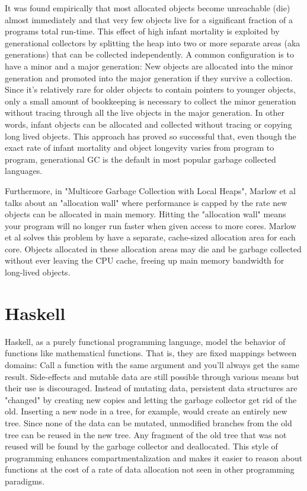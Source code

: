 \documentclass[a4paper,oneside]{memoir}
\begin{document}
It was found empirically that most allocated objects become unreachable (die)
almost immediately and that very few objects live for a significant fraction
of a programs total run-time.\cite{Courts:1988,Appel:1989} This effect of high infant mortality is exploited
by generational collectors by splitting the heap into two or more separate areas
(aka generations) that can be collected independently. A common configuration is
to have a minor and a major generation: New objects are allocated into the minor
generation and promoted into the major generation if they survive a collection.
Since it's relatively rare for older objects to contain pointers to younger
objects, only a small amount of bookkeeping is necessary to collect the minor
generation without tracing through all the live objects in the major generation.\cite{Appel:1989}
In other words, infant objects can be allocated and collected without tracing or
copying long lived objects. This approach has proved so successful that, even
though the exact rate of infant mortality and object longevity varies from
program to program, generational GC is the default in most popular garbage
collected languages.

Furthermore, in "Multicore Garbage Collection with Local Heaps", Marlow et al talks
about an "allocation wall" where performance is capped by the rate new objects
can be allocated in main memory.\cite{Marlow:2011} Hitting the "allocation wall" means your
program will no longer run faster when given access to more cores. Marlow et al
solves this problem by have a separate, cache-sized allocation area for each core.
Objects allocated in these allocation areas may die and be garbage collected
without ever leaving the CPU cache, freeing up main memory bandwidth for
long-lived objects.

\section{Haskell}

Haskell, as a purely functional programming language, model the behavior of
functions like mathematical functions. That is, they are fixed mappings between
domains: Call a function with the same argument and you'll always get the same
result. Side-effects and mutable data are still possible through various means
but their use is discouraged. Instead of mutating data, persistent data structures
are "changed" by creating new copies and letting the garbage collector get rid of
the old. Inserting a new node in a tree, for example, would create an entirely
new tree. Since none of the data can be mutated, unmodified branches from the
old tree can be reused in the new tree. Any fragment of the old tree that was
not reused will be found by the garbage collector and deallocated. This style
of programming enhances compartmentalization and makes it easier to reason about
functions at the cost of a rate of data allocation not seen in other programming
paradigms.
\end{document}
